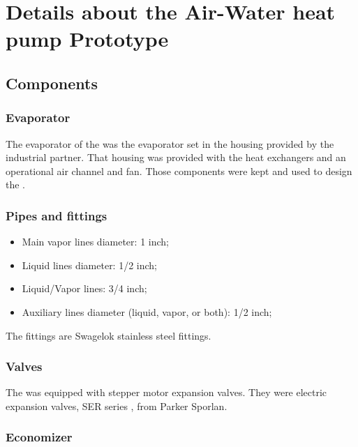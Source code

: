 \chapter{Details about the Air-Water heat
  pump Prototype}
\label{chap:awp-components}
\resetallacronyms

\section{Components}
\label{sec:awp-components}

\subsection{Evaporator}
\label{awp-ev-details}

The evaporator of the \AWP{} was the evaporator set
in the housing provided by the industrial partner. That housing was
provided with the heat exchangers and an operational air channel and
fan. Those components were kept and used to design the \AWP{}.

\subsection{Pipes and fittings}
\label{sec:awp-pipes}

\begin{itemize}
\item Main vapor lines diameter: 1 inch;
\item Liquid lines diameter: 1/2 inch;
\item Liquid/Vapor lines: 3/4 inch;
\item Auxiliary lines diameter (liquid, vapor, or both): 1/2 inch;
\end{itemize}

The fittings are Swagelok stainless steel fittings.

\subsection{Valves}
\label{awp-exp}

The \AWP{} was equipped with stepper motor expansion
valves. They were electric expansion valves,
SER series \citep{sporlan-ser-2015a}, from Parker Sporlan.

\subsection{Economizer}
\label{sec:awp-eco-appendix}

